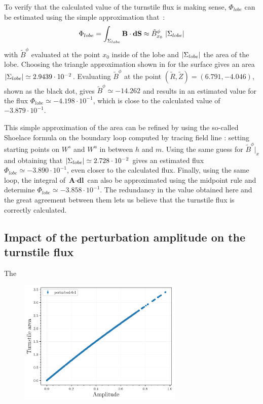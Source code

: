 To verify that the calculated value of the turnstile flux is making sense, $\Phi_{lobe}$ can be estimated using the simple approximation that~:
\begin{equation}
     \Phi_{lobe} = \int_{\Sigma_{lobe}} \textbf{B}\cdot\textbf{dS} \approx \tilde{B}^\phi_{x_0}\,\,\vert\Sigma_{lobe}\vert
\end{equation}
with $\tilde{B}^\phi$ evaluated at the point $x_0$ inside of the lobe and $\vert\Sigma_{lobe}\vert$ the area of the lobe. Choosing the triangle approximation shown in  for the surface gives an area $\vert\Sigma_{lobe}\vert \simeq 2.9439\cdot 10^{-2}$. Evaluating $\tilde{B}^\phi$ at the point $(\tilde{R}, \tilde{Z}) = (6.791, -4.046)$, shown as the black dot, gives $\tilde{B}^\phi \simeq -14.262$ and results in an estimated value for the flux $\Phi_{lobe} \simeq -4.198\cdot 10^{-1}$, which is close to the calculated value of $-3.879\cdot 10^{-1}$.

This simple approximation of the area can be refined by using the so-called Shoelace formula on the boundary loop  computed by tracing field line : setting starting points on $W^s$ and $W^u$ in between $h$ and $m$. Using the same guess for $\tilde{B}^\phi\vert_x$ and obtaining that $\vert\Sigma_{lobe}\vert \simeq 2.728\cdot 10^{-2}$ gives an estimated flux $\Phi_{lobe} \simeq  -3.890\cdot 10^{-1}$, even closer to the calculated flux. Finally, using the same loop, the integral of $\textbf{A}\cdot\textbf{dl}$ can also be approximated using the midpoint rule and determine $\Phi_{lobe} \simeq  -3.858\cdot 10^{-1}$. The redundancy in the value obtained here and the great agreement between them lets us believe that the turnstile flux is correctly calculated.

\subsection{Impact of the perturbation amplitude on the turnstile flux}

The 

\begin{figure}
    \centering
    \includegraphics[width=0.7\textwidth]{images/amplitudescan/turnstile_area.png}
    \caption{}
    \label{fig:scan-6-1}
\end{figure}

